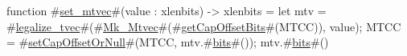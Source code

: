 function #\hyperref[sailRISCVzsetzymtvec]{set\_mtvec}#(value : xlenbits) -> xlenbits = {
  let mtv = #\hyperref[sailRISCVzlegalizzezytvec]{legalize\_tvec}#(#\hyperref[sailRISCVzMkzyMtvec]{Mk\_Mtvec}#(#\hyperref[sailRISCVzgetCapOffsetBits]{getCapOffsetBits}#(MTCC)), value);
  MTCC = #\hyperref[sailRISCVzsetCapOffsetOrNull]{setCapOffsetOrNull}#(MTCC, mtv.#\hyperref[sailRISCVzbits]{bits}#());
  mtv.#\hyperref[sailRISCVzbits]{bits}#()
}
